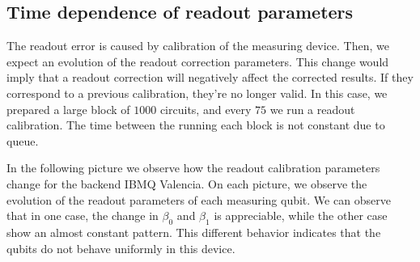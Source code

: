 \subsection{Time dependence of readout parameters}

The readout error is caused by calibration of the measuring device. Then, we expect an evolution of the readout correction parameters. This change would imply that a readout correction will negatively affect the corrected results. If they correspond to a previous calibration, they're no longer valid. In this case, we prepared a large block of $1000$ circuits, and every $75$ we run a readout calibration. The time between the running each block is not constant due to queue.

In the following picture we observe how the readout calibration parameters change for the backend IBMQ Valencia. On each picture, we observe the evolution of the readout parameters of each measuring qubit. We can observe that in one case, the change in $\beta_0$ and $\beta_1$ is appreciable, while the other case show an almost constant pattern. This different behavior indicates that the qubits do not behave uniformly in this device.


